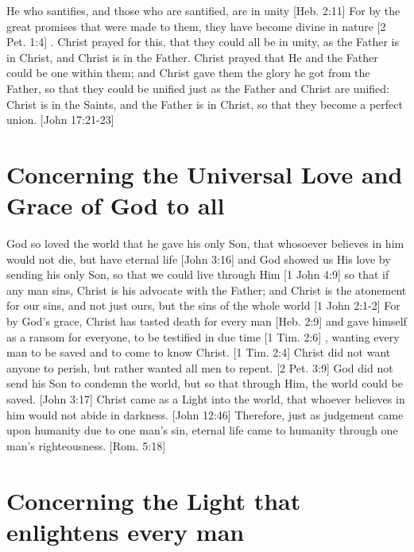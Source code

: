 \documentclass[../main.tex] {subfiles}
\begin{document}
	He who santifies, and those who are santified, are in unity [Heb. 2:11]  For by the great promises that were made to them, they have become divine in nature [2 Pet. 1:4] . Christ prayed for this, that they could all be in unity, as the Father is in Christ, and Christ is in the Father. Christ prayed that He and the Father could be one within them; and Christ gave them the glory he got from the Father, so that they could be unified just as the Father and Christ are unified: Christ is in the Saints, and the Father is in Christ, so that they become a perfect union. [John 17:21-23] 

	\section{Concerning the Universal Love and Grace of God to all}

	God so loved the world that he gave his only Son, that whosoever believes in him would not die, but have eternal life [John 3:16]  and God showed us His love by sending his only Son, so that we could live through Him [1 John 4:9]  so that if any man sins, Christ is his advocate with the Father; and Christ is the atonement for our sins, and not just ours, but the sins of the whole world [1 John 2:1-2]  For by God's grace, Christ has tasted death for every man [Heb. 2:9]  and gave himself as a ransom for everyone, to be testified in due time [1 Tim. 2:6] , wanting every man to be saved and to come to know Christ. [1 Tim. 2:4]  Christ did not want anyone to perish, but rather wanted all men to repent. [2 Pet. 3:9]  God did not send his Son to condemn the world, but so that through Him, the world could be saved. [John 3:17]  Christ came as a Light into the world, that whoever believes in him would not abide in darkness. [John 12:46]  Therefore, just as judgement came upon humanity due to one man's sin, eternal life came to humanity through one man's righteousness. [Rom. 5:18] 

	\section{Concerning the Light that enlightens every man}
\end{document}
